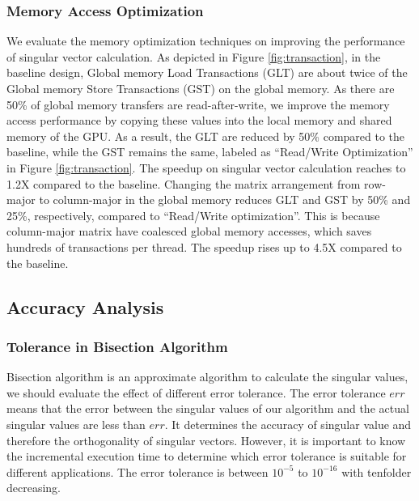 \vspace{-0.2in}
\subsubsection{Memory Access Optimization}
We evaluate the memory optimization techniques on improving the performance
of singular vector calculation. As depicted in Figure \ref{fig:transaction},
in the baseline design,
Global memory Load Transactions (GLT) are about twice of the Global memory Store Transactions (GST) on the global memory.
As there are 50\% of global memory transfers are read-after-write, we improve the memory access performance by copying these values into the local memory and shared memory of the GPU. As a result, the GLT are reduced by 50\% compared to the baseline, while the GST remains the same, labeled as ``Read/Write Optimization'' in Figure \ref{fig:transaction}. The speedup on singular vector calculation reaches to 1.2X compared to the baseline.
Changing the matrix arrangement from row-major to column-major in the global memory 
reduces GLT and GST by 50\% and 25\%, respectively, compared to ``Read/Write optimization''. 
This is because column-major matrix have coalesced global memory accesses, which saves hundreds of transactions per thread. The speedup rises up to 4.5X compared to the baseline.

\vspace{-0.1in}
\subsection{Accuracy Analysis}
\subsubsection{Tolerance in Bisection Algorithm}
Bisection algorithm is an approximate algorithm to calculate the singular values, we should evaluate the effect of different error tolerance.
The error tolerance $err$ means that the error between the singular values of our algorithm and the actual singular values are less than $err$.
It determines the accuracy of singular value and therefore the orthogonality of singular vectors.
However, it is important to know the incremental execution time to determine which error tolerance is suitable for different applications.
The error tolerance is between $10^{-5}$ to $10^{-16}$ with tenfolder decreasing.

